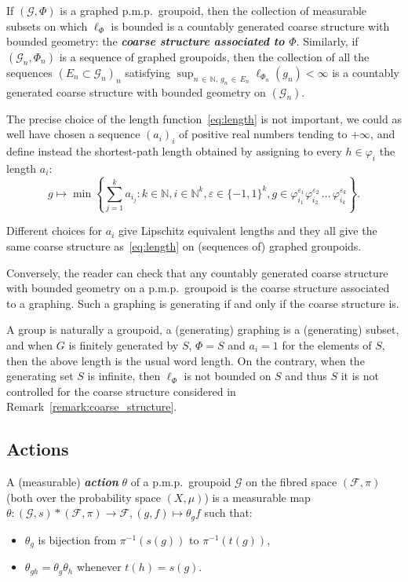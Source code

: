 \documentclass[AHL,Unicode,longabstracts,published]{cedram}
\newcommand{\defin}[1]{\textbf{\emph{#1}}}
\newcommand{\Nmath}{\mathbb{N}}
\newcommand{\cg}{\mathcal{G}}
\newcommand{\cf}{\mathcal{F}}
\newcommand{\ph}{\varphi}
\newcommand{\pmp}{p.m.p.\ }
\begin{document}
\begin{rema}\label{remark:coarse_structure}
If $(\cg,\Phi)$ is a graphed \pmp groupoid, then the collection of measurable subsets on which $\ell_\Phi$ is bounded is a countably generated coarse structure with bounded geometry: the
\defin{coarse structure associated to $\Phi$}. Similarly, if $(\cg_n,\Phi_n)$ is a sequence of graphed groupoids, then the collection of all the sequences $(E_n \subset \cg_n)_n$ satisfying $\sup_{n\,\in\,\Nmath,\,g_n\,\in \,E_n} \ell_{\Phi_n}(g_n)<\infty$ is a countably generated coarse structure with bounded geometry on $(\cg_n)$.

The precise choice of the length function~\eqref{eq:length} is not important, we could as well have chosen a sequence $(a_i)_i$ of positive real numbers tending to $+\infty$, and define instead the shortest-path length obtained by assigning to every $h \in \ph_i$ the length $a_i$:
\[
g\mapsto \min\left\{ \sum_{j=1}^k a_{i_j} : k \in \Nmath, i \in \Nmath^k, \varepsilon \in \{-1,1\}^k, g \in \ph_{i_1}^{\varepsilon_1}\ph_{i_2}^{\varepsilon_2}\,\dots \,\ph_{i_k}^{\varepsilon_k} \right\}.
\]

Different choices for $a_i$ give Lipschitz equivalent lengths and they all give the same coarse structure as~\eqref{eq:length} on (sequences of) graphed groupoids.

Conversely, the reader can check that any countably generated coarse structure with bounded geometry on a \pmp groupoid is the coarse structure associated to a graphing. Such a graphing is generating if and only if the coarse structure is.
\end{rema}
\begin{exam}
A group is naturally a groupoid, a (generating) graphing is a (generating) subset, and when $G$ is finitely generated by $S$, $\Phi=S$ and $a_i=1$ for the elements of $S$, then the above length is the usual word length. On the contrary, when the generating set $S$ is infinite, then $\ell_{\Phi}$ is not bounded on $S$ and thus $S$ it is not controlled for the coarse structure considered in Remark~\ref{remark:coarse_structure}.
\end{exam}

\subsection{Actions}\label{sec:actions}
\begin{defi}
A (measurable)
\defin{action} $\theta$ of a \pmp groupoid $\cg$ on the fibred space $(\cf,\pi)$ (both over the probability space $(X,\mu)$) is a measurable map $\theta: (\cg,s) \ast (\cf,\pi) \to \cf, (g,f)\mapsto \theta_g f$ such that:
\begin{itemize}
\item $\theta_g$ is bijection from $\pi^{-1}(s(g))$ to $\pi^{-1}(t(g))$,
\item $\theta_{gh}=\theta_g\theta_h$ whenever $t(h)=s(g)$.
\end{itemize}
\end{defi}
\end{document}

